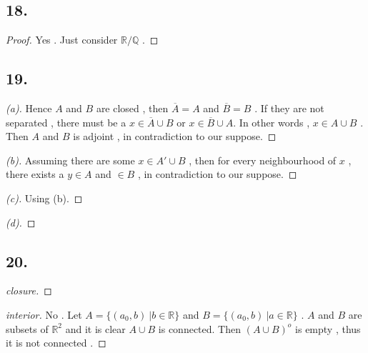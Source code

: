 \documentclass{report}
\begin{document}
            \subsection*{18.}
                \begin{proof}
                    Yes . Just consider $\mathbb{R}/\mathbb{Q}$ .
                \end{proof}
            \subsection*{19.}
                \begin{proof}[(a)]
                    Hence $A$ and $B$ are closed , then $\overline{A}=A$ and $\overline{B}=B$ .
                    If they are not separated , there must be a $x \in \overline{A}\cup B$ or $x \in \overline{B}\cup A$.
                    In other words , $x\in A\cup B$ .\\
                    Then $A$ and $B$ is adjoint , in contradiction to our suppose.
                \end{proof}
                \begin{proof}[(b)]
                    Assuming there are some $x \in A' \cup B$ , then for every neighbourhood of $x$ , there exists a $y \in A$ and $ \in B$ , 
                    in contradiction to our suppose.
                \end{proof}
                \begin{proof}[(c)]
                    Using (b).
                \end{proof}
                \begin{proof}[(d)]
                    
                \end{proof}
            \subsection*{20.}
                \begin{proof}[closure]

                \end{proof}
                \begin{proof}[interior]
                    No . Let $A=\{(a_0,b)\ | b \in \mathbb{R}\}$ and $B=\{(a_0,b)\ | a \in \mathbb{R}\}$ .
                    $A$ and $B$ are subsets of $\mathbb{R}^2$ and it is clear $A\cup B$ is connected.
                    Then $(A\cup B)^o$ is empty , thus it is not connected .
                \end{proof}
\end{document}
